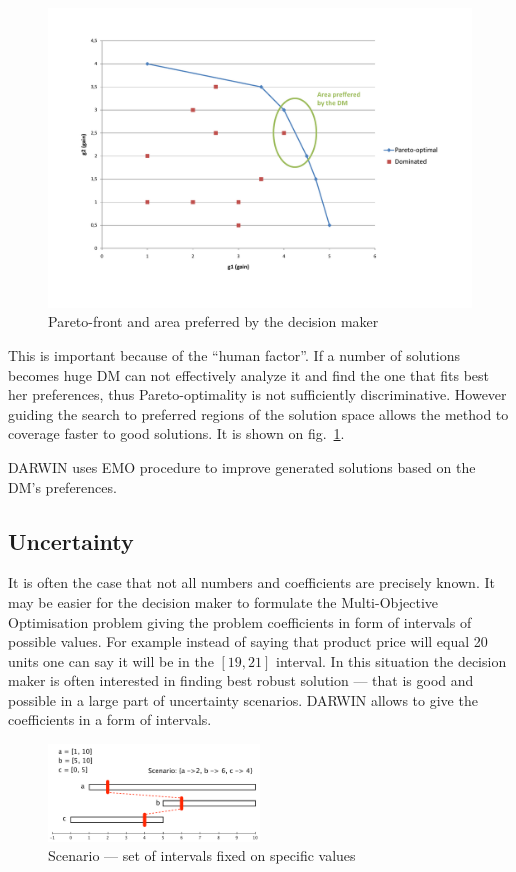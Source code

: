 \begin{figure}
  \centering \includegraphics[width=1.2\textwidth]{img/pareto}
  \caption{Pareto-front and area preferred by the decision maker}
  \label{pareto}
\end{figure}

This is important because of the ``human factor''. If a number of solutions
becomes huge DM can not effectively analyze it and find the one that fits best
her preferences, thus Pareto-optimality is not sufficiently
discriminative. However guiding the search to preferred regions of the
solution space allows the method to coverage faster to good solutions. It is
shown on fig.~\ref{pareto}.

DARWIN uses EMO procedure to improve generated solutions based on the DM's
preferences.


\subsection{Uncertainty}

It is often the case that not all numbers and coefficients are precisely
known. It may be easier for the decision maker to formulate the
Multi-Objective Optimisation problem giving the problem coefficients in form
of intervals of possible values. For example instead of saying that product
price will equal 20 units one can say it will be in the $[19, 21]$
interval. In this situation the decision maker is often interested in finding
best robust solution --- that is good and possible in a large part of
uncertainty scenarios. DARWIN allows to give the coefficients in a form of
intervals.

\begin{figure}
  \centering \includegraphics[width=0.5\textwidth]{img/scenario}
  \caption{Scenario --- set of intervals fixed on specific values}
  \label{scenario}
\end{figure}


